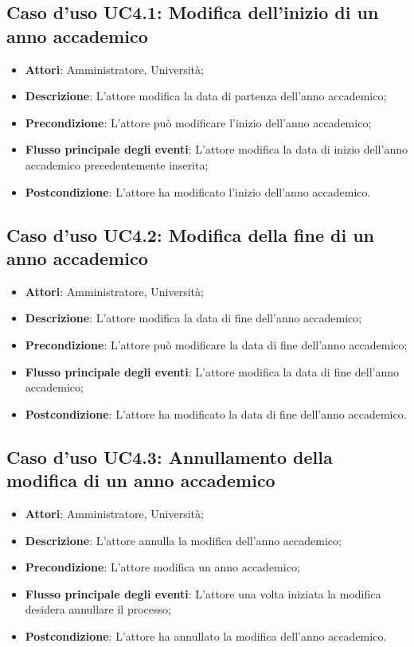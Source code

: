 \subsection{Caso d'uso \texorpdfstring{UC4.1}{UC4.1}: Modifica dell'inizio di un anno accademico}
\begin{itemize}
\item \textbf{Attori}: Amministratore, Università;
\item \textbf{Descrizione}: L'attore modifica la data di partenza dell'anno accademico;
\item \textbf{Precondizione}: L'attore può modificare l'inizio dell'anno accademico;
\item \textbf{Flusso principale degli eventi}: L'attore modifica la data di inizio dell'anno accademico precedentemente inserita;
\item \textbf{Postcondizione}: L'attore ha modificato l'inizio dell'anno accademico.
\end{itemize}
\subsection{Caso d'uso \texorpdfstring{UC4.2}{UC4.2}: Modifica della fine di un anno accademico}
\begin{itemize}
\item \textbf{Attori}: Amministratore, Università;
\item \textbf{Descrizione}: L'attore modifica la data di fine dell'anno accademico;
\item \textbf{Precondizione}: L'attore può modificare la data di fine dell'anno accademico;
\item \textbf{Flusso principale degli eventi}: L'attore modifica la data di fine dell'anno accademico;
\item \textbf{Postcondizione}: L'attore ha modificato la data di fine dell'anno accademico.
\end{itemize}
\subsection{Caso d'uso \texorpdfstring{UC4.3}{UC4.3}: Annullamento della modifica di un anno accademico}
\begin{itemize}
\item \textbf{Attori}: Amministratore, Università;
\item \textbf{Descrizione}: L'attore annulla la modifica dell'anno accademico;
\item \textbf{Precondizione}: L'attore modifica un anno accademico;
\item \textbf{Flusso principale degli eventi}: L'attore una volta iniziata la modifica desidera annullare il processo;
\item \textbf{Postcondizione}: L'attore ha annullato la modifica dell'anno accademico.
\end{itemize}
